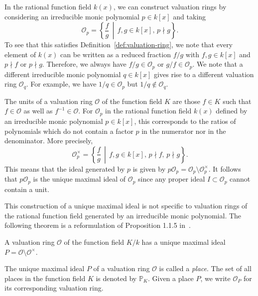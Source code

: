 In the rational function field \(k(x)\), we can construct valuation rings by considering an irreducible monic polynomial \(p \in k[x]\) and taking
\[\mathcal{O}_{p} = \left\{ \frac{f}{g} \,\middle|\, f,g \in k[x] ,\, p \nmid g \right\}.\]
To see that this satisfies Definition~\ref{def:valuation-ring}, we note that every element of \(k(x)\) can be written as a reduced fraction \(f/g\) with \(f,g \in k[x]\) and \(p \nmid f\) or \(p \nmid g\). Therefore, we always have \(f/g \in \mathcal{O}_{p}\) or \(g/f \in \mathcal{O}_{p}\). We note that a different irreducible monic polynomial \(q \in k[x]\) gives rise to a different valuation ring \(\mathcal{O}_{q}\). For example, we have \(1/q \in \mathcal{O}_{p}\) but \(1/q \notin \mathcal{O}_{q}\).

The units of a valuation ring \(\mathcal{O}\) of the function field \(K\) are those \(f \in K\) such that \(f \in \mathcal{O}\) as well as \(f^{-1} \in \mathcal{O}\). For \(\mathcal{O}_{p}\) in the rational function field \(k(x)\) defined by an irreducible monic polynomial \(p \in k[x]\), this corresponds to the ratios of polynomials which do not contain a factor \(p\) in the numerator nor in the denominator. More precisely,
\[\mathcal{O}_{p}^{\times} = \left\{ \frac{f}{g} \,\middle|\, f,g \in k[x] ,\, p \nmid f ,\, p \nmid g \right\}.\]
This means that the ideal generated by \(p\) is given by \(p\mathcal{O}_{p} = \mathcal{O}_{p} \setminus \mathcal{O}_{p}^{\times}\). It follows that \(p\mathcal{O}_{p}\) is the unique maximal ideal of \(\mathcal{O}_{p}\) since any proper ideal \(I \subset \mathcal{O}_{p}\) cannot contain a unit.

This construction of a unique maximal ideal is not specific to valuation rings of the rational function field generated by an irreducible monic polynomial. The following theorem is a reformulation of Proposition 1.1.5 in~\cite{stichtenoth-2009-algebraic-function-fields}.

\begin{theorem}%
  \label{thm:place-is-maximal-ideal}
  A valuation ring \(\mathcal{O}\) of the function field \(K / k\) has a unique maximal ideal \(P = \mathcal{O} \setminus \mathcal{O}^{\times}\).
\end{theorem}

The unique maximal ideal \(P\) of a valuation ring \(\mathcal{O}\) is called a \textit{place}. The set of all places in the function field \(K\) is denoted by \(\mathbb{P}_{K}\). Given a place \(P\), we write \(\mathcal{O}_{P}\) for its corresponding valuation ring.

